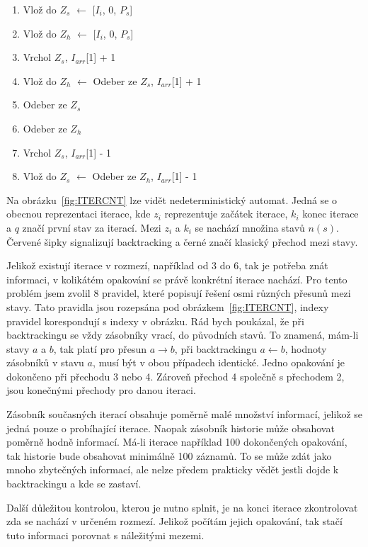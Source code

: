 \begin{enumerate}[label=\arabic* --]
	\item Vlož do $Z_s$ $\longleftarrow$ [$I_i$, 0, $P_s$]
	\item Vlož do $Z_h$ $\longleftarrow$ [$I_i$, 0, $P_s$]
	\item Vrchol $Z_s$, $I_{arr}$[1] + 1
	\item Vlož do $Z_h$ $\longleftarrow$ Odeber ze $Z_s$, $I_{arr}$[1] + 1
	\item Odeber ze $Z_s$
	\item Odeber ze $Z_h$
	\item Vrchol $Z_s$, $I_{arr}$[1] - 1
	\item Vlož do $Z_s$ $\longleftarrow$ Odeber ze $Z_h$, $I_{arr}$[1] - 1
\end{enumerate}

Na obrázku~\ref{fig:ITERCNT} lze vidět nedeterministický automat. 
Jedná se o obecnou reprezentaci iterace, kde $z_i$ reprezentuje začátek iterace, $k_i$ konec iterace a $q$ značí první stav za iterací.
Mezi $z_i$ a $k_i$ se nachází množina stavů $n(s)$.
Červené šipky signalizují backtracking a černé značí klasický přechod mezi stavy.

Jelikož existují iterace v rozmezí, například od 3 do 6, tak je potřeba znát informaci, v kolikátém opakování se právě konkrétní iterace nachází.
Pro tento problém jsem zvolil 8 pravidel, které popisují řešení osmi různých přesunů mezi stavy.
Tato pravidla jsou rozepsána pod obrázkem~\ref{fig:ITERCNT}, indexy pravidel korespondují s indexy v obrázku.
Rád bych poukázal, že při backtrackingu se vždy zásobníky vrací, do původních stavů. 
To znamená, mám-li stavy $a$ a $b$, tak platí pro přesun $a \rightarrow b$, při backtrackingu $a \leftarrow b$, hodnoty zásobníků v stavu $a$, musí být v obou případech identické.
Jedno opakování je dokončeno při přechodu 3 nebo 4. 
Zároveň přechod 4 společně s přechodem 2, jsou konečnými přechody pro danou iteraci.

Zásobník současných iterací obsahuje poměrně malé množství informací, jelikož se jedná pouze o probíhající iterace.
Naopak zásobník historie může obsahovat poměrně hodně informací. 
Má-li iterace například 100 dokončených opakování, tak historie bude obsahovat minimálně 100 záznamů.
To se může zdát jako mnoho zbytečných informací, ale nelze předem prakticky vědět jestli dojde k backtrackingu a kde se zastaví.

Další důležitou kontrolou, kterou je nutno splnit, je na konci iterace zkontrolovat zda se nachází v určeném rozmezí.
Jelikož počítám jejich opakování, tak stačí tuto informaci porovnat s náležitými mezemi.

